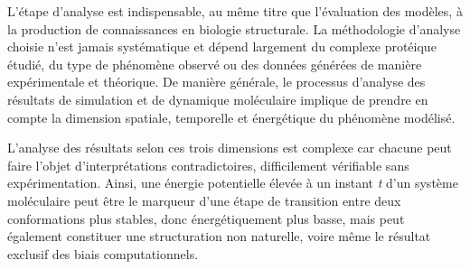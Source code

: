 L'étape d'analyse est indispensable, au même titre que l'évaluation des modèles, à la production de connaissances en biologie structurale. La méthodologie d'analyse choisie n'est jamais systématique et dépend largement du complexe protéique étudié, du type de phénomène observé ou des données générées de manière expérimentale et théorique. De manière générale, le processus d'analyse des résultats de simulation et de dynamique moléculaire implique de prendre en compte la dimension spatiale, temporelle et énergétique du phénomène modélisé.






L'analyse des résultats selon ces trois dimensions est complexe car chacune peut faire l'objet d'interprétations contradictoires, difficilement vérifiable sans expérimentation. Ainsi, une énergie potentielle élevée à un instant \textit{t} d'un système moléculaire peut être le marqueur d'une étape de transition entre deux conformations plus stables, donc énergétiquement plus basse, mais peut également constituer une structuration non naturelle, voire même le résultat exclusif des biais computationnels. %



